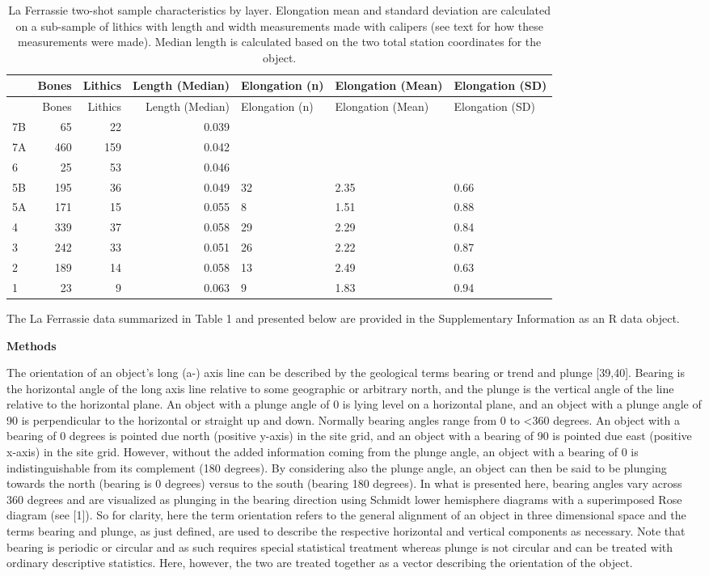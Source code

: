 \documentclass[]{article}
\begin{document}
\begin{longtable}[]{@{}lrrrlll@{}}
\caption{La Ferrassie two-shot sample characteristics by layer.
Elongation mean and standard deviation are calculated on a sub-sample of
lithics with length and width measurements made with calipers (see text
for how these measurements were made). Median length is calculated based
on the two total station coordinates for the object.}\tabularnewline
\toprule
& Bones & Lithics & Length (Median) & Elongation (n) & Elongation (Mean)
& Elongation (SD)\tabularnewline
\midrule
\endfirsthead
\toprule
& Bones & Lithics & Length (Median) & Elongation (n) & Elongation (Mean)
& Elongation (SD)\tabularnewline
\midrule
\endhead
7B & 65 & 22 & 0.039 & & &\tabularnewline
7A & 460 & 159 & 0.042 & & &\tabularnewline
6 & 25 & 53 & 0.046 & & &\tabularnewline
5B & 195 & 36 & 0.049 & 32 & 2.35 & 0.66\tabularnewline
5A & 171 & 15 & 0.055 & 8 & 1.51 & 0.88\tabularnewline
4 & 339 & 37 & 0.058 & 29 & 2.29 & 0.84\tabularnewline
3 & 242 & 33 & 0.051 & 26 & 2.22 & 0.87\tabularnewline
2 & 189 & 14 & 0.058 & 13 & 2.49 & 0.63\tabularnewline
1 & 23 & 9 & 0.063 & 9 & 1.83 & 0.94\tabularnewline
\bottomrule
\end{longtable}

The La Ferrassie data summarized in Table 1 and presented below are
provided in the Supplementary Information as an R data object.

\textbf{Methods}

The orientation of an object's long (a-) axis line can be described by
the geological terms bearing or trend and plunge {[}39,40{]}. Bearing is
the horizontal angle of the long axis line relative to some geographic
or arbitrary north, and the plunge is the vertical angle of the line
relative to the horizontal plane. An object with a plunge angle of 0 is
lying level on a horizontal plane, and an object with a plunge angle of
90 is perpendicular to the horizontal or straight up and down. Normally
bearing angles range from 0 to \textless{}360 degrees. An object with a
bearing of 0 degrees is pointed due north (positive y-axis) in the site
grid, and an object with a bearing of 90 is pointed due east (positive
x-axis) in the site grid. However, without the added information coming
from the plunge angle, an object with a bearing of 0 is
indistinguishable from its complement (180 degrees). By considering also
the plunge angle, an object can then be said to be plunging towards the
north (bearing is 0 degrees) versus to the south (bearing 180 degrees).
In what is presented here, bearing angles vary across 360 degrees and
are visualized as plunging in the bearing direction using Schmidt lower
hemisphere diagrams with a superimposed Rose diagram (see {[}1{]}). So
for clarity, here the term orientation refers to the general alignment
of an object in three dimensional space and the terms bearing and
plunge, as just defined, are used to describe the respective horizontal
and vertical components as necessary. Note that bearing is periodic or
circular and as such requires special statistical treatment whereas
plunge is not circular and can be treated with ordinary descriptive
statistics. Here, however, the two are treated together as a vector
describing the orientation of the object.
\end{document}
